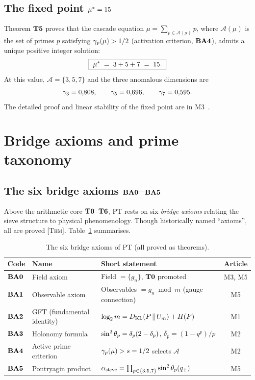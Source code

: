 \subsection{The fixed point \texorpdfstring{$\mu^{*} = 15$}{μ*=15}}
\label{sec:crible:mustar}

Theorem $\textbf{T5}$ proves that the cascade equation $\mu = \sum_{p \in \mathcal A(\mu)} p$, where $\mathcal A(\mu)$ is the set of primes $p$ satisfying $\gamma_{p}(\mu) > 1/2$ (activation criterion, $\textbf{BA4}$), admits a unique positive integer solution:
\[
\boxed{\;\mu^{*} \;=\; 3 + 5 + 7 \;=\; 15.\;}
\]
At this value, $\mathcal A = \{3, 5, 7\}$ and the three anomalous dimensions are
\[
\gamma_{3} = 0{,}808, \qquad \gamma_{5} = 0{,}696, \qquad \gamma_{7} = 0{,}595.
\]
The detailed proof and linear stability of the fixed point are in M3~\cite{companion_M3}.

\section{Bridge axioms and prime taxonomy}
\label{sec:bridge}

\subsection{The six bridge axioms \texorpdfstring{$\textbf{BA0}$--$\textbf{BA5}$}{BA0-BA5}}
\label{sec:bridge:BAn}

Above the arithmetic core $\textbf{T0}$--$\textbf{T6}$, PT rests on six \emph{bridge axioms} relating the sieve structure to physical phenomenology. Though historically named ``axioms'', all are proved \textsc{[Thm]}. Table~\ref{tab:BAn_en} summarises.

\begin{table}[htbp]
\centering
\small
\begin{tabular}{@{}lp{4.5cm}p{4.5cm}c@{}}
\toprule
Code & Name & Short statement & Article \\
\midrule
$\textbf{BA0}$ & Field axiom & Field $= \{g_n\}$, $\textbf{T0}$ promoted & M3, M5 \\
$\textbf{BA1}$ & Observable axiom & Observables $= g_n \bmod m$ (gauge connection) & M5 \\
$\textbf{BA2}$ & GFT (fundamental identity) & $\log_2 m = D_{\rm KL}(P\,\|\,U_m) + H(P)$ & M1 \\
$\textbf{BA3}$ & Holonomy formula & $\sin^{2}\theta_{p} = \delta_p(2 - \delta_p)$, $\delta_p = (1 - q^p)/p$ & M2 \\
$\textbf{BA4}$ & Active prime criterion & $\gamma_{p}(\mu) > s = 1/2$ selects $\mathcal A$ & M2 \\
$\textbf{BA5}$ & Pontryagin product & $\alpha_{\rm sieve} = \prod_{p \in \{3,5,7\}} \sin^{2}\theta_{p}(q_{+})$ & M5 \\
\bottomrule
\end{tabular}
\caption{The six bridge axioms of PT (all proved as theorems).}
\label{tab:BAn_en}
\end{table}

